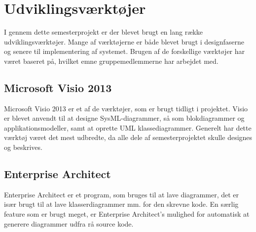\chapter{Udviklingsværktøjer}

I gennem dette semesterprojekt er der blevet brugt en lang række udviklingsværktøjer. Mange af værktøjerne er både blevet brugt i designfaserne og senere til implementering af systemet. Brugen af de forskellige værktøjer har været baseret på, hvilket emne gruppemedlemmerne har arbejdet med.

\section*{Microsoft Visio 2013}

Microsoft Visio 2013 er et af de værktøjer, som er brugt tidligt i projektet. Visio er blevet anvendt til at designe SysML-diagrammer, så som blokdiagrammer og applikationsmodeller, samt at oprette UML klassediagrammer. Generelt har dette værktøj været det mest udbredte, da alle dele af semesterprojektet skulle designes og beskrives.

\section*{Enterprise Architect}

Enterprise Architect er et program, som bruges til at lave diagrammer, det er især brugt til at lave klasserdiagrammer mm. for den skrevne kode. En særlig feature som er brugt meget, er Enterprise Architect's mulighed for automatisk at generere diagrammer udfra rå source kode.